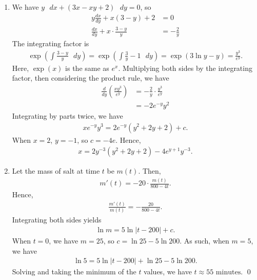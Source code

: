 \documentclass[12pt]{article}
\begin{document}
\begin{enumerate}[label=\textbf{(\alph*)}]
    \itemsep 0em
    \item We have $y\text{ }dx+\left(3x-xy+2\right)\text{ }dy=0$, so \begin{align*}
        y\frac{dx}{dy}+x\left(3-y\right)+2&=0\\
        \frac{dx}{dy}+x\cdot \frac{3-y}{y}&=-\frac{2}{y}
    \end{align*}
    The integrating factor is \begin{align*}
        \operatorname{exp}\left(\int \frac{3-y}{y}\text{ }dy\right)=\operatorname{exp}\left(\int \frac{3}{y}-1\text{ }dy\right)=\operatorname{exp}\left(3\operatorname{ln}y-y\right)=\frac{y^3}{e^y}.
    \end{align*}
    Here, $\operatorname{exp}\left(x\right)$ is the same as $e^x$. Multiplying both sides by the integrating factor, then considering the product rule, we have \begin{align*}
        \frac{d}{dy}\left(\frac{xy^3}{e^y}\right)&=-\frac{2}{y}\cdot \frac{y^3}{e^y}\\
        &=-2e^{-y}y^2
    \end{align*}
    Integrating by parts twice, we have \begin{align*}
        xe^{-y}y^3=2e^{-y}\left(y^2+2y+2\right)+c.
    \end{align*}
    When $x=2$, $y=-1$, so $c=-4e$. Hence, \begin{align*}
        x=2y^{-3}\left(y^2+2y+2\right)-4e^{y+1}y^{-3}.
    \end{align*}
    \item Let the mass of salt at time $t$ be $m\left(t\right)$. Then, \begin{align*}
        m'\left(t\right)=-20\cdot \frac{m\left(t\right)}{800-4t}.
    \end{align*}
    Hence, \begin{align*}
        \frac{m'\left(t\right)}{m\left(t\right)}=-\frac{20}{800-4t}.
    \end{align*}
    Integrating both sides yields \begin{align*}
        \operatorname{ln}m=5\operatorname{ln}\left|t-200\right|+c.
    \end{align*}
    When $t=0$, we have $m=25$, so $c=\operatorname{ln}25-5\operatorname{ln}200$. As such, when $m=5$, we have \begin{align*}
        \operatorname{ln}5=5\operatorname{ln}\left|t-200\right|+\operatorname{ln}25-5\operatorname{ln}200.
    \end{align*}
    Solving and taking the minimum of the $t$ values, we have $t\approx 55\text{ minutes}$. \qed 
\end{enumerate}
\end{document}
